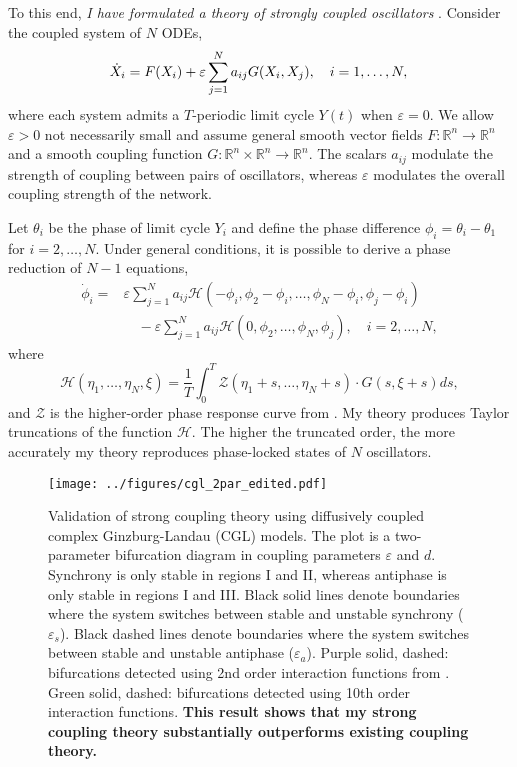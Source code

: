 \documentclass[a4paper,11pt]{article}
\newcommand{\ve}{\varepsilon}
\newcommand{\h}{\mathcal{H}}
\begin{document}
To this end, \textit{I have formulated a theory of strongly coupled oscillators} \cite{park2020high}. Consider the coupled system of $N$ ODEs,
\begin{equation}\label{eq:odes}
\dot X_i = F(X_i) +\ve \sum_{j=1}^N a_{ij} G(X_i,X_j), \quad i=1,\ldots,N,\\
\end{equation}
where each system admits a $T$-periodic limit cycle $Y(t)$ when $\ve=0$. We allow $\ve>0$ not necessarily small and assume general smooth vector fields $F:\mathbb{R}^n \rightarrow \mathbb{R}^n$ and a smooth coupling function $G:\mathbb{R}^n\times\mathbb{R}^n\rightarrow \mathbb{R}^n$. The scalars $a_{ij}$ modulate the strength of coupling between pairs of oscillators, whereas $\ve$ modulates the overall coupling strength of the network.

Let $\theta_i$ be the phase of limit cycle $Y_i$ and define the phase difference $\phi_i=\theta_i-\theta_1$ for $i=2,\ldots,N$. Under general conditions, it is possible to derive a phase reduction of $N-1$ equations,
\begin{align*}
\dot \phi_i =& \ve\sum_{j=1}^N a_{ij} \h(-\phi_i,\phi_2-\phi_i,\ldots,\phi_N-\phi_i,\phi_j-\phi_i)\\
&\quad- \ve\sum_{j=1}^N a_{ij} \h(0,\phi_2,\ldots,\phi_N,\phi_j), \quad i=2,\ldots,N,
\end{align*}
where
\begin{equation*}
\h(\eta_1,\ldots,\eta_N,\xi) = \frac{1}{T} \int_0^T \mathcal{Z}(\eta_1+s,\ldots,\eta_N+s) \cdot G(s,\xi+s)ds,
\end{equation*}
and $\mathcal{Z}$ is the higher-order phase response curve from \cite{wilson2020phase}. My theory produces Taylor truncations of the function $\h$. The higher the truncated order, the more accurately my theory reproduces phase-locked states of $N$ oscillators.

\begin{figure}[ht!]
	\centering
	\texttt{[image: ../figures/cgl\_2par\_edited.pdf]}
	\caption{Validation of strong coupling theory using diffusively coupled complex Ginzburg-Landau (CGL) models. The plot is a two-parameter bifurcation diagram in coupling parameters $\ve$ and $d$. Synchrony is only stable in regions I and II, whereas antiphase is only stable in regions I and III. Black solid lines denote boundaries where the system switches between stable and unstable synchrony ($\ve_s$). Black dashed lines denote boundaries where the system switches between stable and unstable antiphase ($\ve_a$). Purple solid, dashed: bifurcations detected using 2nd order interaction functions from \cite{wilson2019phase}. Green solid, dashed: bifurcations detected using 10th order interaction functions. \textbf{This result shows that my strong coupling theory substantially outperforms existing coupling theory.}}\label{fig:cgl}
\end{figure}
\end{document}
